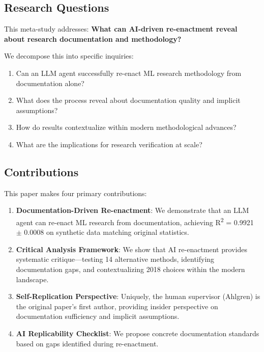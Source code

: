 \documentclass[conference]{IEEEtran}
\begin{document}
\subsection{Research Questions}

This meta-study addresses: \textbf{What can AI-driven re-enactment reveal about research documentation and methodology?}

We decompose this into specific inquiries:

\begin{enumerate}
    \item Can an LLM agent successfully re-enact ML research methodology from documentation alone?
    \item What does the process reveal about documentation quality and implicit assumptions?
    \item How do results contextualize within modern methodological advances?
    \item What are the implications for research verification at scale?
\end{enumerate}

\subsection{Contributions}

This paper makes four primary contributions:

\begin{enumerate}
    \item \textbf{Documentation-Driven Re-enactment}: We demonstrate that an LLM agent can re-enact ML research from documentation, achieving R\textsuperscript{2} = 0.9921 $\pm$ 0.0008 on synthetic data matching original statistics.

    \item \textbf{Critical Analysis Framework}: We show that AI re-enactment provides systematic critique---testing 14 alternative methods, identifying documentation gaps, and contextualizing 2018 choices within the modern landscape.

    \item \textbf{Self-Replication Perspective}: Uniquely, the human supervisor (Ahlgren) is the original paper's first author, providing insider perspective on documentation sufficiency and implicit assumptions.

    \item \textbf{AI Replicability Checklist}: We propose concrete documentation standards based on gaps identified during re-enactment.
\end{enumerate}
\end{document}
